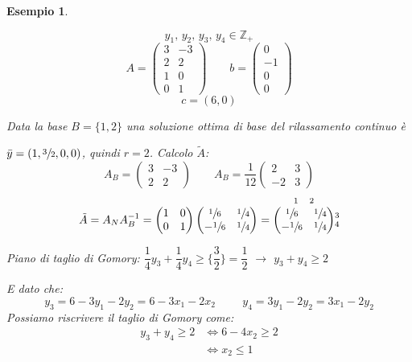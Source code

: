 \documentclass[a4paper,11pt]{book}
\newcommand{\integers}{\mathbb{Z}}
\theoremstyle{break}
\newtheorem{es}[deff]{Esempio}
\begin{document}
\begin{es}
\begin{multicols}{2}
   \[y_1,\, y_2,\, y_3,\, y_4  \in \integers_+\]
\[A = \begin{pmatrix}
       3 & -3\\
       2 & 2\\
       1 & 0\\
       0 & 1
      \end{pmatrix}
\quad\quad b = \begin{pmatrix}
                0\\-1\\0\\0
               \end{pmatrix}
\]
\[c = (6,0)\]
    \end{multicols}
Data la base $B = \{1, 2\}$ una soluzione ottima di base del rilassamento continuo è 

$\bar y = (1, \sfrac{3}{2}, 0,0)$, quindi $r = 2$. Calcolo $\tilde A$:
\[ A_B = \begin{pmatrix}
          3 & -3\\2&2
         \end{pmatrix} \quad\quad A_B =  \dfrac{1}{12}\begin{pmatrix}
          2 & 3\\-2&3
         \end{pmatrix}\]\[\tilde A = A_N A_B^{-1} = \begin{pmatrix}
          1 & 0\\0&1
         \end{pmatrix}\begin{pmatrix}
          \sfrac{1}{6} & \sfrac{1}{4}\\-\sfrac{1}{6}&\sfrac{1}{4}
         \end{pmatrix} = \overset{\scriptsize \begin{matrix}
                                    1 & 2
                                   \end{matrix}
         }{\begin{pmatrix}
          \sfrac{1}{6} & \sfrac{1}{4}\\-\sfrac{1}{6}&\sfrac{1}{4}
         \end{pmatrix}} \scriptsize \begin{matrix}
                                    3\\4
                                   \end{matrix}
 \]
 
 Piano di taglio di Gomory: $\dfrac{1}{4}y_3 + \dfrac{1}{4} y_4 \geq \Bigg\{\dfrac{3}{2}\Bigg\} = \dfrac{1}{2}$ $\to$ $y_3 + y_4 \geq 2$\smallskip
 
 
 E dato che: \[y_3 =6-3y_1 - 2y_2 =6-3x_1 - 2x_2 \hspace{1cm} y_4 = 3y_1 - 2y_2 = 3x_1 -2y_2\]
 Possiamo riscrivere il taglio di Gomory come: \[\begin{aligned}
y_3 + y_4 \geq 2 &\iff 6-4x_2 \geq 2\\
                 &\iff x_2 \leq 1
              \end{aligned}\]

\end{es}
\end{document}
